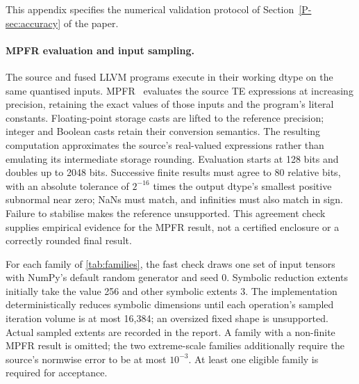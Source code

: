 \documentclass[acmsmall,screen,review,anonymous,nonacm]{acmart}
\newcommand{\pref}[1]{\ref{P-#1} of the paper}
\begin{document}
This appendix specifies the numerical validation protocol of Section~\pref{sec:accuracy}.

\paragraph{MPFR evaluation and input sampling.}
The source and fused LLVM programs execute in their working dtype on the same quantised inputs.
MPFR~\citep{mpfr} evaluates the source TE expressions at increasing precision, retaining the exact values of those inputs and the program's literal constants.
Floating-point storage casts are lifted to the reference precision; integer and Boolean casts retain their conversion semantics.
The resulting computation approximates the source's real-valued expressions rather than emulating its intermediate storage rounding.
Evaluation starts at 128 bits and doubles up to 2048 bits.
Successive finite results must agree to 80 relative bits, with an absolute tolerance of $2^{-16}$ times the output dtype's smallest positive subnormal near zero; NaNs must match, and infinities must also match in sign.
Failure to stabilise makes the reference unsupported.
This agreement check supplies empirical evidence for the MPFR result, not a certified enclosure or a correctly rounded final result.

For each family of \cref{tab:families}, the fast check draws one set of input tensors with NumPy's default random generator and seed 0.
Symbolic reduction extents initially take the value 256 and other symbolic extents 3.
The implementation deterministically reduces symbolic dimensions until each operation's sampled iteration volume is at most 16,384; an oversized fixed shape is unsupported.
Actual sampled extents are recorded in the report.
A family with a non-finite MPFR result is omitted; the two extreme-scale families additionally require the source's normwise error to be at most $10^{-3}$.
At least one eligible family is required for acceptance.
\end{document}
